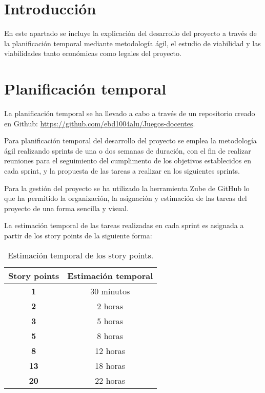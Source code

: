 
\section{Introducción}
En este apartado se incluye la explicación del desarrollo del proyecto a través de la planificación temporal mediante metodología ágil, el estudio de viabilidad y las viabilidades tanto económicas como legales del proyecto.

\section{Planificación temporal}
La planificación temporal se ha llevado a cabo a través de un repositorio creado en Github: \url{https://github.com/ebd1004alu/Juegos-docentes}.

Para planificación temporal del desarrollo del proyecto se emplea la metodología ágil realizando sprints de una o dos semanas de duración, con el fin de realizar reuniones para el seguimiento del cumplimento de los objetivos establecidos en cada sprint, y la propuesta de las tareas a realizar en los siguientes sprints.

Para la gestión del proyecto se ha utilizado la herramienta Zube de GitHub lo que ha permitido la organización, la asignación y estimación de las tareas del proyecto de una forma sencilla y visual.

La estimación temporal de las tareas realizadas en cada sprint es asignada a partir de los story points de la siguiente forma:

\begin{table}[ht!]
    \centering
    \resizebox{8cm}{!} {
    \begin{tabular}{|c|c|}
    \hline
    \rowcolor[rgb]{0.99,0.93,0.93}
    \textbf{Story points}   & \textbf{Estimación temporal} \\ \hline
    \textbf{1}              & 30 minutos \\ \hline 
    \textbf{2}              &  2 horas \\ \hline
    \textbf{3}              &  5 horas \\ \hline 
    \textbf{5}              &  8 horas \\ \hline 
    \textbf{8}              & 12 horas \\ \hline 
    \textbf{13}              & 18 horas \\ \hline 
    \textbf{20}              & 22 horas \\ \hline 
   
    \end{tabular}}
    \caption{Estimación temporal de los story points.}
    \label{tab:my_label}
\end{table}
\newpage

